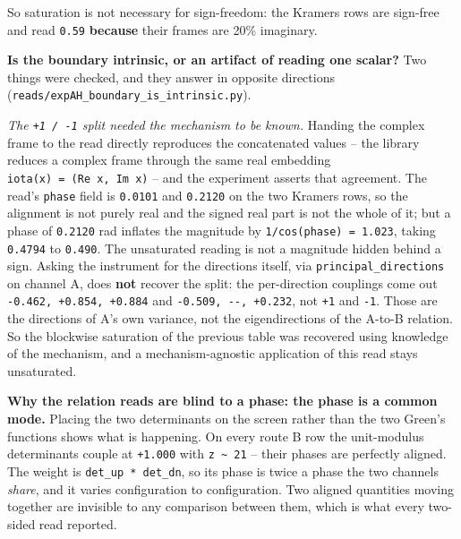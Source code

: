 \documentclass[10pt,letterpaper,twocolumn]{article}
\begin{document}
So saturation is not necessary for sign-freedom: the Kramers rows are sign-free and read \texttt{0.\allowbreak{}59}
\textbf{because} their frames are 20\% imaginary.

\textbf{Is the boundary intrinsic, or an artifact of reading one scalar?} Two things were checked, and
they answer in opposite directions (\texttt{reads/\allowbreak{}expAH\_\allowbreak{}boundary\_\allowbreak{}is\_\allowbreak{}intrinsic.\allowbreak{}py}).

\emph{The \texttt{+\allowbreak{}1\ /\allowbreak{}\ -{}\allowbreak{}1} split needed the mechanism to be known.} Handing the complex frame to the read
directly reproduces the concatenated values -- the library reduces a complex frame through the same
real embedding \texttt{iota(\allowbreak{}x)\allowbreak{}\ =\allowbreak{}\ (\allowbreak{}Re\ x,\allowbreak{}\ Im\ x)\allowbreak{}} -- and the experiment asserts that agreement. The read's
\texttt{phase} field is \texttt{0.\allowbreak{}0101} and \texttt{0.\allowbreak{}2120} on the two Kramers rows, so the
alignment is not purely real and the signed real part is not the whole of it; but a phase of
\texttt{0.\allowbreak{}2120} rad inflates the magnitude by \texttt{1/\allowbreak{}cos(\allowbreak{}phase)\allowbreak{}\ =\allowbreak{}\ 1.\allowbreak{}023}, taking \texttt{0.\allowbreak{}4794} to \texttt{0.\allowbreak{}490}. The
unsaturated reading is not a magnitude hidden behind a sign. Asking the instrument for the
directions itself,
via \texttt{principal\_\allowbreak{}directions} on channel A, does \textbf{not} recover the split: the per-direction couplings
come out \texttt{-{}\allowbreak{}0.\allowbreak{}462,\allowbreak{}\ +\allowbreak{}0.\allowbreak{}854,\allowbreak{}\ +\allowbreak{}0.\allowbreak{}884} and \texttt{-{}\allowbreak{}0.\allowbreak{}509,\allowbreak{}\ -{}\allowbreak{}-{}\allowbreak{},\allowbreak{}\ +\allowbreak{}0.\allowbreak{}232}, not \texttt{+\allowbreak{}1} and \texttt{-{}\allowbreak{}1}. Those are the directions of
A's own variance, not the eigendirections of the A-to-B relation. So the blockwise saturation of the
previous table was recovered using knowledge of the mechanism, and a mechanism-agnostic application
of this read stays unsaturated.

\textbf{Why the relation reads are blind to a phase: the phase is a common mode.} Placing the two
determinants on the screen rather than the two Green's functions shows what is happening. On every
route B row the unit-modulus determinants couple at \texttt{+\allowbreak{}1.\allowbreak{}000} with \texttt{z\ \textasciitilde{}\ 21} -- their phases are
perfectly aligned. The weight is \texttt{det\_\allowbreak{}up\ *\allowbreak{}\ det\_\allowbreak{}dn}, so its phase is twice a phase the two channels
\emph{share}, and it varies configuration to configuration. Two aligned quantities moving together are
invisible to any comparison between them, which is what every two-sided read reported.
\end{document}
